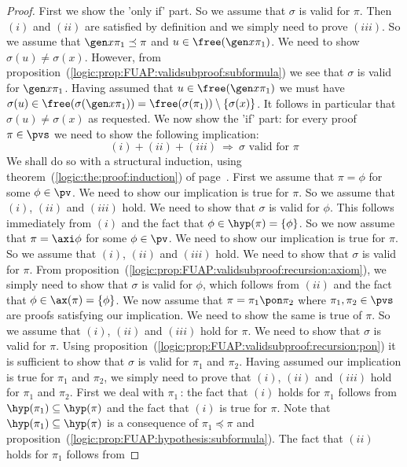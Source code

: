 \begin{proof}
First we show the 'only if' part. So we assume that $\sigma$ is
valid for $\pi$. Then $(i)$ and $(ii)$ are satisfied by definition
and we simply need to prove $(iii)$. So we assume that $\gen
x\pi_{1}\preceq\pi$ and $u\in\free(\gen x\pi_{1})$. We need to show
$\sigma(u)\neq\sigma(x)$. However, from
proposition~(\ref{logic:prop:FUAP:validsubproof:subformula}) we see
that $\sigma$ is valid for $\gen x\pi_{1}$. Having assumed that
$u\in\free(\gen x\pi_{1})$ we must have
$\sigma(u)\in\free(\sigma(\gen
x\pi_{1}))=\free(\sigma(\pi_{1}))\setminus\{\sigma(x)\}$. It follows
in particular that $\sigma(u)\neq\sigma(x)$ as requested. We now
show the 'if' part: for every proof $\pi\in\pvs$ we need to show the
following implication:
     \[
     (i)+(ii)+(iii)\ \Rightarrow\ \mbox{$\sigma$ valid for $\pi$}
     \]
We shall do so with a structural induction, using
theorem~(\ref{logic:the:proof:induction}) of
page~\pageref{logic:the:proof:induction}. First we assume that
$\pi=\phi$ for some $\phi\in\pv$. We need to show our implication is
true for $\pi$. So we assume that $(i)$, $(ii)$ and $(iii)$ hold. We
need to show that $\sigma$ is valid for $\phi$. This follows
immediately from $(i)$ and the fact that
$\phi\in\hyp(\pi)=\{\phi\}$. So we now assume that $\pi=\axi\phi$
for some $\phi\in\pv$. We need to show our implication is true for
$\pi$. So we assume that $(i)$, $(ii)$ and $(iii)$ hold. We need to
show that $\sigma$ is valid for $\pi$. From
proposition~(\ref{logic:prop:FUAP:validsubproof:recursion:axiom}),
we simply need to show that $\sigma$ is valid for $\phi$, which
follows from $(ii)$ and the fact that $\phi\in\ax(\pi)=\{\phi\}$. We
now assume that $\pi=\pi_{1}\pon\pi_{2}$ where
$\pi_{1},\pi_{2}\in\pvs$ are proofs satisfying our implication. We
need to show the same is true of $\pi$.  So we assume that $(i)$,
$(ii)$ and $(iii)$ hold for $\pi$. We need to show that $\sigma$ is
valid for $\pi$. Using
proposition~(\ref{logic:prop:FUAP:validsubproof:recursion:pon}) it
is sufficient to show that $\sigma$ is valid for $\pi_{1}$ and
$\pi_{2}$. Having assumed our implication is true for $\pi_{1}$ and
$\pi_{2}$, we simply need to prove that $(i)$, $(ii)$ and $(iii)$
hold for $\pi_{1}$ and $\pi_{2}$. First we deal with $\pi_{1}$\,:
the fact that $(i)$ holds for $\pi_{1}$ follows from
$\hyp(\pi_{1})\subseteq\hyp(\pi)$ and the fact that $(i)$ is true
for $\pi$. Note that $\hyp(\pi_{1})\subseteq\hyp(\pi)$ is a
consequence of $\pi_{1}\preceq\pi$ and
proposition~(\ref{logic:prop:FUAP:hypothesis:subformula}). The fact
that $(ii)$ holds for $\pi_{1}$ follows from

\end{proof}
